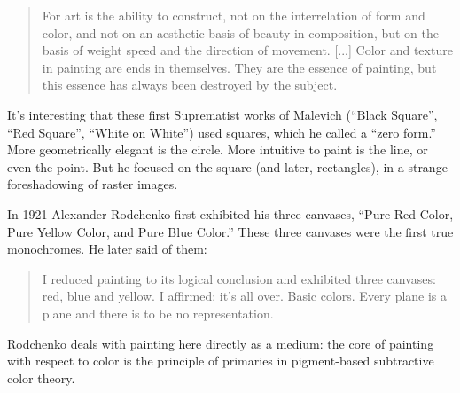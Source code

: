 \documentclass{thesis}
\begin{document}
	\begin{quote}
	For art is the ability to construct, not on the interrelation of form and color, and not on an aesthetic basis of beauty in composition, but on the basis of weight speed and the direction of movement. [...] Color and texture in painting are ends in themselves. They are the essence of painting, but this essence has always been destroyed by the subject.
	\end{quote}
	
	It's interesting that these first Suprematist works of Malevich (``Black Square'', ``Red Square'', ``White on White'') used squares, which he called a ``zero form.'' More geometrically elegant is the circle. More intuitive to paint is the line, or even the point. But he focused on the square (and later, rectangles), in a strange foreshadowing of raster images.
	
	\cite{moma_rodchenko_1998}
	In 1921 Alexander Rodchenko first exhibited his three canvases, ``Pure Red Color, Pure Yellow Color, and Pure Blue Color.'' These three canvases were the first true monochromes. He later said of them:
	
	\begin{quote}
	I reduced painting to its logical conclusion and exhibited three canvases: red, blue and yellow. I affirmed: it's all over. Basic colors. Every plane is a plane and there is to be no representation.
	\end{quote}
	
	Rodchenko deals with painting here directly as a medium: the core of painting with respect to color is the principle of primaries in pigment-based subtractive color theory.
	
\end{document}
